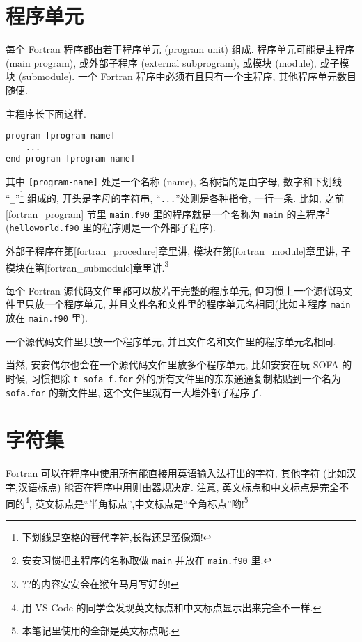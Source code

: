 \section{程序单元}\label{program_unit}

每个 Fortran 程序都由若干程序单元 (program unit) 组成. 程序单元可能是主程序 (main program), 或外部子程序 (external subprogram), 或模块 (module), 或子模块 (submodule). 一个 Fortran 程序中必须有且只有一个主程序, 其他程序单元数目随便.

主程序长下面这样.
\begin{lstlisting}
program [program-name]
    ...
end program [program-name]
\end{lstlisting}
其中 \texttt{[program-name]} 处是一个名称 (name), 名称指的是由字母, 数字和下划线 ``\texttt{\_{}}''\footnote{
    下划线是空格的替代字符,长得还是蛮像滴!
} 组成的, 开头是字母的字符串, ``\texttt{...}''处则是各种指令, 一行一条. 比如, 之前 \ref{fortran_program} 节里 \texttt{main.f90} 里的程序就是一个名称为 \texttt{main} 的主程序\footnote{安安习惯把主程序的名称取做 \texttt{main} 并放在 \texttt{main.f90} 里.} \\(\texttt{helloworld.f90} 里的程序则是一个外部子程序).

外部子程序在第\ref{fortran_procedure}章里讲, 模块在第\ref{fortran_module}章里讲, 子模块在第\ref{fortran_submodule}章里讲.\footnote{??\mbox{}的内容安安会在猴年马月写好的!}

每个 Fortran 源代码文件里都可以放若干完整的程序单元, 但习惯上一个源代码文件里只放一个程序单元, 并且文件名和文件里的程序单元名相同(比如主程序 \texttt{main} 放在 \texttt{main.f90} 里).
\begin{convention}
    一个源代码文件里只放一个程序单元, 并且文件名和文件里的程序单元名相同.\label{one_program_unit}
\end{convention}
当然, 安安偶尔也会在一个源代码文件里放多个程序单元, 比如安安在玩 SOFA 的时候, 习惯把除 \texttt{t\_{}sofa\_{}f.for} 外的所有文件里的东东通通复制粘贴到一个名为 \texttt{sofa.for} 的新文件里, 这个文件里就有一大堆外部子程序了.

\section{字符集}

Fortran 可以在程序中使用所有能直接用英语输入法打出的字符, 其他字符 (比如汉字,汉语标点) 能否在程序中用则由器规决定. 注意, 英文标点和中文标点是\uline{完全不同}的\footnote{用 VS Code 的同学会发现英文标点和中文标点显示出来完全不一样.}, 英文标点是``半角标点'',中文标点是``全角标点''哟!\footnote{本笔记里使用的全部是英文标点呢.}

